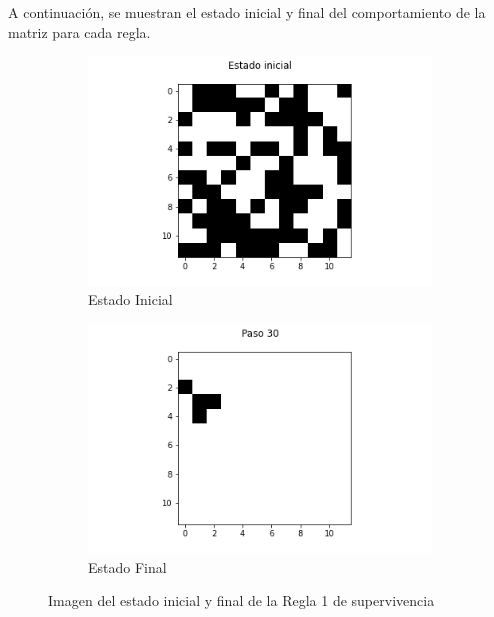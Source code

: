 \documentclass{article}
\begin{document}
A continuación, se muestran el estado inicial y final del comportamiento de la matriz para cada regla.

\begin{figure}[h!]
\centering
\begin{subfigure}[b]{0.45\linewidth}
\includegraphics[width=\linewidth]{p2_r1_t00_p.png}
\caption{Estado Inicial}
\end{subfigure}
\begin{subfigure}[b]{0.45\linewidth}
\includegraphics[width=\linewidth]{p2_r1_t30_p.png}
\caption{Estado Final}
\end{subfigure}
\caption{Imagen del estado inicial y final de la Regla 1 de supervivencia}
\label{fig:westminster}
\end{figure}
\end{document}
